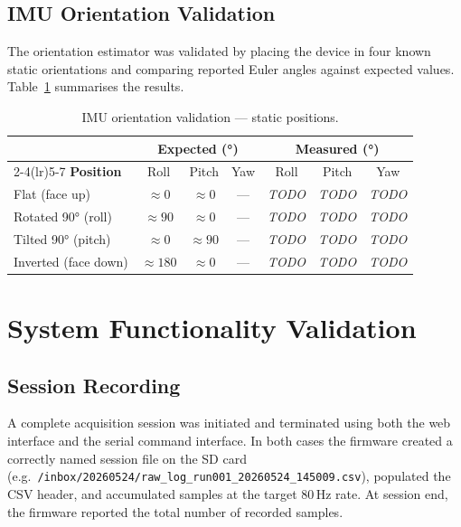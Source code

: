 \subsection{IMU Orientation Validation}

The orientation estimator was validated by placing the device in four
known static orientations and comparing reported Euler angles against
expected values.
Table~\ref{tab:imu_static} summarises the results.

\begin{table}[h]
  \centering
  \caption{IMU orientation validation — static positions.}
  \label{tab:imu_static}
  \begin{tabular}{lcccccc}
    \toprule
    & \multicolumn{3}{c}{\textbf{Expected (°)}}
    & \multicolumn{3}{c}{\textbf{Measured (°)}} \\
    \cmidrule(lr){2-4}\cmidrule(lr){5-7}
    \textbf{Position} & Roll & Pitch & Yaw & Roll & Pitch & Yaw \\
    \midrule
    Flat (face up)       & $\approx 0$  & $\approx 0$  & --- & \textit{TODO} & \textit{TODO} & \textit{TODO} \\
    Rotated 90° (roll)   & $\approx 90$ & $\approx 0$  & --- & \textit{TODO} & \textit{TODO} & \textit{TODO} \\
    Tilted 90° (pitch)   & $\approx 0$  & $\approx 90$ & --- & \textit{TODO} & \textit{TODO} & \textit{TODO} \\
    Inverted (face down) & $\approx 180$& $\approx 0$  & --- & \textit{TODO} & \textit{TODO} & \textit{TODO} \\
    \bottomrule
  \end{tabular}
\end{table}

\section{System Functionality Validation}
\label{section:system_validation}

\subsection{Session Recording}

A complete acquisition session was initiated and terminated using both
the web interface and the serial command interface.
In both cases the firmware created a correctly named session file on the
SD card (e.g.\ \texttt{/inbox/20260524/raw\_log\_run001\_20260524\_145009.csv}),
populated the CSV header, and accumulated samples at the target 80\,Hz rate.
At session end, the firmware reported the total number of recorded samples.

